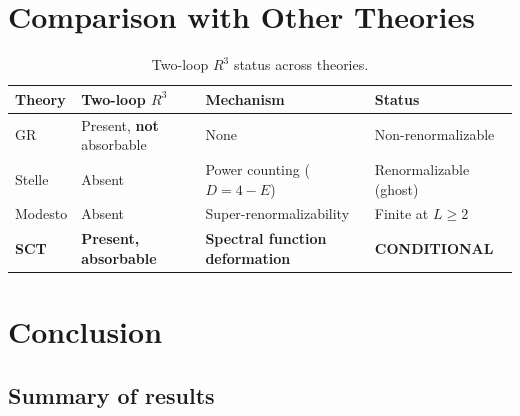 \documentclass[12pt,a4paper]{article}
\begin{document}
\section{Comparison with Other Theories}
\label{sec:comparison}

\begin{table}[H]
\centering
\caption{Two-loop $R^3$ status across theories.}
\label{tab:comparison}
\begin{tabular}{llll}
\toprule
Theory & Two-loop $R^3$ & Mechanism & Status \\
\midrule
GR       & Present, \textbf{not} absorbable & None
  & Non-renormalizable \\
Stelle   & Absent & Power counting ($D = 4 - E$)
  & Renormalizable (ghost) \\
Modesto  & Absent & Super-renormalizability
  & Finite at $L \geq 2$ \\
\textbf{SCT} & \textbf{Present, absorbable}
  & \textbf{Spectral function deformation}
  & \textbf{CONDITIONAL} \\
\bottomrule
\end{tabular}
\end{table}

\section{Conclusion}
\label{sec:conclusion}

\subsection{Summary of results}
\end{document}
